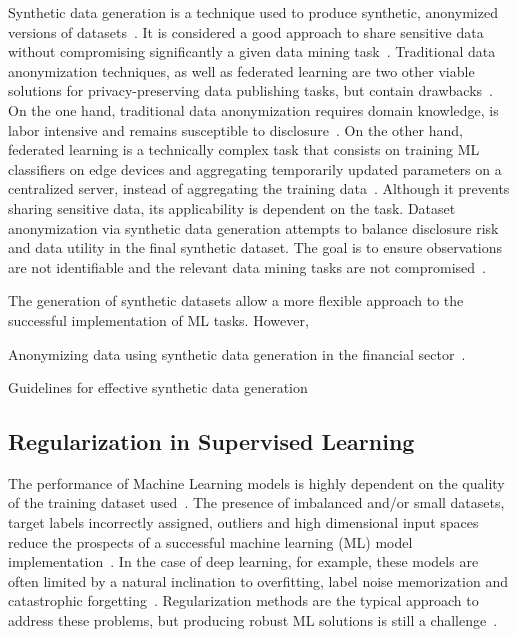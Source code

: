 \documentclass[parskip=full]{scrartcl}
\begin{document}
Synthetic data generation is a technique used to produce synthetic, anonymized
versions of datasets~\cite{dankar2021fake}. It is considered a good approach
to share sensitive data without compromising significantly a given data mining
task~\cite{taub2018differential, park2018data}. Traditional data anonymization
techniques, as well as federated learning are two other viable solutions for
privacy-preserving data publishing tasks, but contain
drawbacks~\cite{hernandez2022synthetic}. On the one hand, traditional data
anonymization requires domain knowledge, is labor intensive and remains
susceptible to disclosure~\cite{reiter2004new}. On the other hand, federated
learning is a technically complex task that consists on training ML
classifiers on edge devices and aggregating temporarily updated parameters on
a centralized server, instead of aggregating the training
data~\cite{yu2022survey}. Although it prevents sharing sensitive data, its
applicability is dependent on the task. Dataset anonymization via synthetic
data generation attempts to balance disclosure risk and data utility in the
final synthetic dataset. The goal is to ensure observations are not
identifiable and the relevant data mining tasks are not
compromised~\cite{singh2017aggregating, li2018privacy}.

The generation of synthetic datasets allow a more flexible approach to the
successful implementation of ML tasks. However,

Anonymizing data using synthetic data generation in the financial
sector~\cite{assefa2020generating}.

Guidelines for effective synthetic data generation~\cite{dankar2021fake}





\subsection{Regularization in Supervised Learning}

The performance of Machine Learning models is highly dependent on the quality
of the training dataset used~\cite{Fenza2021, Halevy2009}. The presence of
imbalanced and/or small datasets, target labels incorrectly assigned, outliers
and high dimensional input spaces reduce the prospects of a successful machine
learning (ML) model implementation~\cite{Halevy2009, Domingos2012,
Salman2019}. In the case of deep learning, for example, these
models are often limited by a natural inclination to overfitting, label noise
memorization and catastrophic forgetting~\cite{Xie2021}. Regularization
methods are the typical approach to address these problems, but producing
robust ML solutions is still a challenge~\cite{Zhang2021}.
\end{document}
